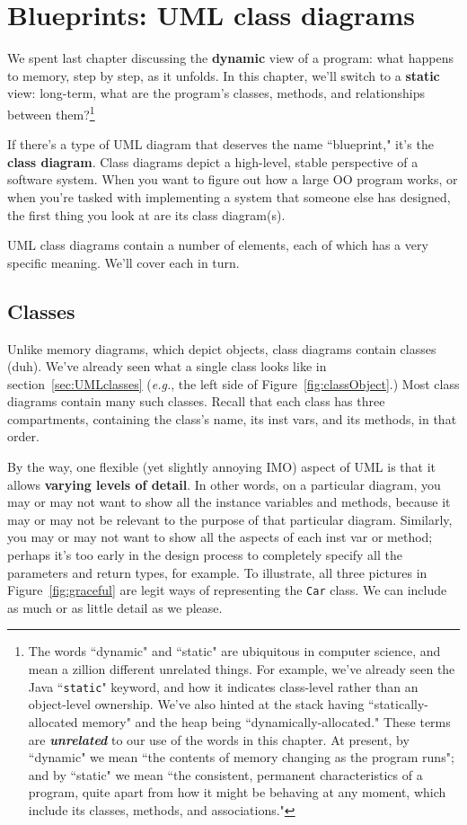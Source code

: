 
\chapter{Blueprints: UML class diagrams}
\label{ch:blueprints}

We spent last chapter discussing the \textbf{dynamic} view of a program: what
happens to memory, step by step, as it unfolds. In this chapter, we'll switch
to a \textbf{static} view: long-term, what are the program's classes, methods,
and relationships between them?\footnote{The words ``dynamic" and ``static"
are ubiquitous in computer science, and mean a zillion different unrelated
things. For example, we've already seen the Java ``\texttt{static}" keyword,
and how it indicates class-level rather than an object-level ownership. We've
also hinted at the stack having ``statically-allocated memory" and the heap
being ``dynamically-allocated." These terms are \textbf{\textit{unrelated}} to
our use of the words in this chapter. At present, by ``dynamic" we mean ``the
contents of memory changing as the program runs"; and by ``static" we mean
``the consistent, permanent characteristics of a program, quite apart from how
it might be behaving at any moment, which include its classes, methods, and
associations."}

If there's a type of UML diagram that deserves the name ``blueprint," it's the
\textbf{class diagram}. Class diagrams depict a high-level, stable perspective
of a software system. When you want to figure out how a large OO program
works, or when you're tasked with implementing a system that someone else has
designed, the first thing you look at are its class diagram(s).

UML class diagrams contain a number of elements, each of which has a very
specific meaning. We'll cover each in turn.

\section{Classes}

Unlike memory diagrams, which depict objects, class diagrams contain classes
(duh). We've already seen what a single class looks like in
section~\ref{sec:UMLclasses} (\textit{e.g.}, the left side of
Figure~\ref{fig:classObject}.) Most class diagrams contain many such classes.
Recall that each class has three compartments, containing the class's name,
its inst vars, and its methods, in that order.

By the way, one flexible (yet slightly annoying IMO) aspect of UML is that it
allows \textbf{varying levels of detail}. In other words, on a particular
diagram, you may or may not want to show all the instance variables and
methods, because it may or may not be relevant to the purpose of that
particular diagram. Similarly, you may or may not want to show all the aspects
of each inst var or method; perhaps it's too early in the design process to
completely specify all the parameters and return types, for example. To
illustrate, all three pictures in Figure~\ref{fig:graceful} are legit
ways of representing the \texttt{Car} class. We can include as much or as
little detail as we please.


